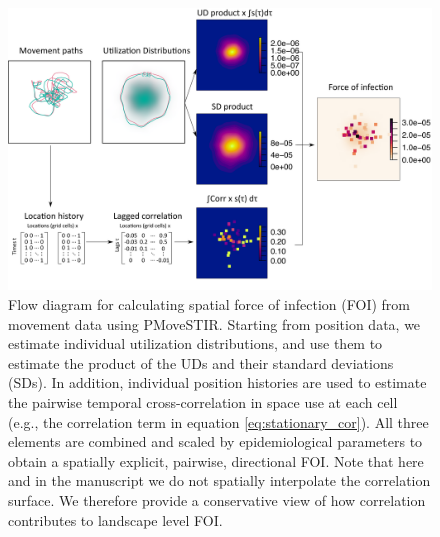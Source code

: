 \documentclass[letterpaper]{article}
\begin{document}
 \begin{figure}
     \includegraphics[width=\textwidth]{figures/steps_diagram.png}
     \caption{Flow diagram for calculating spatial force of infection (FOI) from movement data using PMoveSTIR. Starting from position data, we estimate individual utilization distributions, and use them to estimate the product of the UDs and their standard deviations (SDs). In addition, individual position histories are used to estimate the pairwise temporal cross-correlation in space use at each cell (e.g., the correlation term in equation \ref{eq:stationary_cor}). All three elements are combined and scaled by epidemiological parameters to obtain a spatially explicit, pairwise, directional FOI. Note that here and in the manuscript we do not spatially interpolate the correlation surface. We therefore provide a conservative view of how correlation contributes to landscape level FOI.}
 	\label{fig:steps}
 \end{figure}
\end{document}
